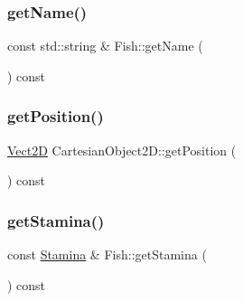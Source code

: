 \mbox{\label{classFish_a96583314997aab0826f1c595f7d58938_a96583314997aab0826f1c595f7d58938}} 
\subsubsection{\texorpdfstring{get\+Name()}{getName()}}
{\footnotesize\ttfamily const std\+::string \& Fish\+::get\+Name (\begin{DoxyParamCaption}{ }\end{DoxyParamCaption}) const\hspace{0.3cm}{\ttfamily [inherited]}}

\mbox{\label{classCartesianObject2D_aa3a6b63777852ab9eb9408ed2536abe2_aa3a6b63777852ab9eb9408ed2536abe2}} 
\subsubsection{\texorpdfstring{get\+Position()}{getPosition()}}
{\footnotesize\ttfamily \hyperlink{classVect2D}{Vect2D} Cartesian\+Object2\+D\+::get\+Position (\begin{DoxyParamCaption}{ }\end{DoxyParamCaption}) const\hspace{0.3cm}{\ttfamily [inherited]}}

\mbox{\label{classFish_a8637a567ecb17376bed45783d5ddb53d_a8637a567ecb17376bed45783d5ddb53d}} 
\subsubsection{\texorpdfstring{get\+Stamina()}{getStamina()}}
{\footnotesize\ttfamily const \hyperlink{classStamina}{Stamina} \& Fish\+::get\+Stamina (\begin{DoxyParamCaption}{ }\end{DoxyParamCaption}) const\hspace{0.3cm}{\ttfamily [inherited]}}

